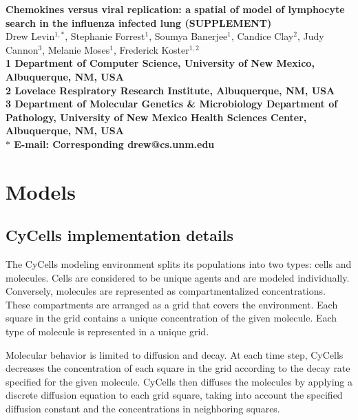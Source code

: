 \documentclass[10pt]{article}
\date{}
\begin{document}
\begin{flushleft}
{\Large
\textbf{Chemokines versus viral replication: a spatial of model of lymphocyte search in the influenza infected lung (SUPPLEMENT)}
}
\\
Drew Levin$^{1,\ast}$, 
Stephanie Forrest$^{1}$, 
Soumya Banerjee$^{1}$,
Candice Clay$^{2}$, 
Judy Cannon$^{3}$,
Melanie Moses$^{1}$, 
Frederick Koster$^{1,2}$
\\
\bf{1} Department of Computer Science, University of New Mexico, Albuquerque, NM, USA
\\
\bf{2} Lovelace Respiratory Research Institute, Albuquerque, NM, USA
\\
\bf{3} Department of Molecular Genetics \& Microbiology Department of Pathology, University of New Mexico Health Sciences Center, Albuquerque, NM, USA
\\
$\ast$ E-mail: Corresponding drew@cs.unm.edu
\end{flushleft}


\section{Models}

\subsection{CyCells implementation details}

The CyCells modeling environment splits its populations into two types: cells and molecules.  Cells are considered to be unique agents and are modeled individually.  Conversely, molecules are represented as compartmentalized concentrations.  These compartments are arranged as a grid that covers the environment.  Each square in the grid contains a unique concentration of the given molecule.  Each type of  molecule is represented in a unique grid.

Molecular behavior is limited to diffusion and decay.  At each time step, CyCells decreases the concentration of each square in the grid according to the decay rate specified for the given molecule.  CyCells then diffuses the molecules by applying a discrete diffusion equation to each grid square, taking into account the specified diffusion constant and the concentrations in neighboring squares.
\end{document}
